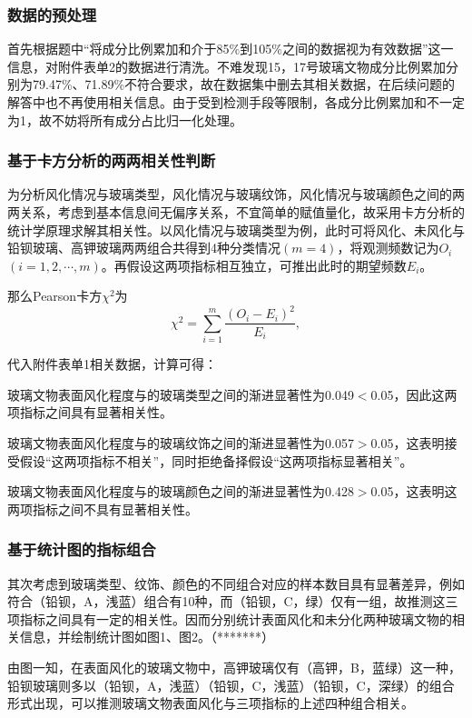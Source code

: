 \documentclass[withoutpreface,bwprint]{cumcmthesis}
\begin{document}
\subsubsection{数据的预处理}
	首先根据题中“将成分比例累加和介于85\%到105\%之间的数据视为有效数据”这一信息，对附件表单2的数据进行清洗。不难发现15，17号玻璃文物成分比例累加分别为79.47\%、71.89\%不符合要求，故在数据集中删去其相关数据，在后续问题的解答中也不再使用相关信息。由于受到检测手段等限制，各成分比例累加和不一定为1，故不妨将所有成分占比归一化处理。
\subsubsection{基于卡方分析的两两相关性判断}
为分析风化情况与玻璃类型，风化情况与玻璃纹饰，风化情况与玻璃颜色之间的两两关系，考虑到基本信息间无偏序关系，不宜简单的赋值量化，故采用卡方分析的统计学原理求解其相关性。以风化情况与玻璃类型为例，此时可将风化、未风化与铅钡玻璃、高钾玻璃两两组合共得到4种分类情况$(m=4)$，将观测频数记为$O_i$$(i=1,2,\cdots,m)$。再假设这两项指标相互独立，可推出此时的期望频数$E_i$。

那么Pearson卡方$\chi^2$为
\begin{equation}
   \chi^2=\sum_{i=1}^m\frac{(O_i-E_i)^2}{E_i},
\end{equation}

代入附件表单1相关数据，计算可得：

玻璃文物表面风化程度与的玻璃类型之间的渐进显著性为0.049$<$0.05，因此这两项指标之间具有显著相关性。

玻璃文物表面风化程度与的玻璃纹饰之间的渐进显著性为0.057$>$0.05，这表明接受假设“这两项指标不相关”，同时拒绝备择假设“这两项指标显著相关”。

玻璃文物表面风化程度与的玻璃颜色之间的渐进显著性为0.428$>$0.05，这表明这两项指标之间不具有显著相关性。


\subsubsection{基于统计图的指标组合}
其次考虑到玻璃类型、纹饰、颜色的不同组合对应的样本数目具有显著差异，例如符合（铅钡，A，浅蓝）组合有10种，而（铅钡，C，绿）仅有一组，故推测这三项指标之间具有一定的相关性。因而分别统计表面风化和未分化两种玻璃文物的相关信息，并绘制统计图如图1、图2。（*******）


由图一知，在表面风化的玻璃文物中，高钾玻璃仅有（高钾，B，蓝绿）这一种，铅钡玻璃则多以（铅钡，A，浅蓝）（铅钡，C，浅蓝）（铅钡，C，深绿）的组合形式出现，可以推测玻璃文物表面风化与三项指标的上述四种组合相关。
\end{document}
